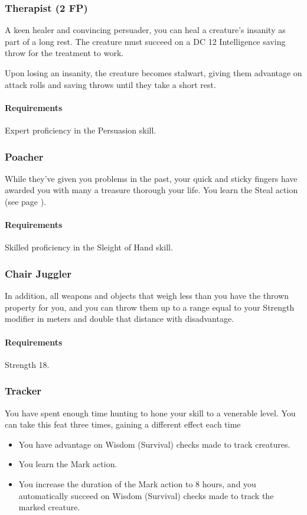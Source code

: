 \subsubsection{Therapist (2 FP)} \label{feat::therapist}
    A keen healer and convincing persuader, you can heal a creature's insanity as part of a long rest.
    The creature must succeed on a DC 12 Intelligence saving throw for the treatment to work.

    Upon losing an insanity, the creature becomes stalwart, giving them advantage on attack rolls and saving throws until they take a short rest.
    \paragraph{Requirements} Expert proficiency in the Persuasion skill.
\subsubsection{Poacher} \label{feat::poacher}
    While they've given you problems in the past, your quick and sticky fingers have awarded you with many a treasure thorough your life.
    You learn the Steal action (see page \pageref{act::steal}).
    \paragraph{Requirements} Skilled proficiency in the Sleight of Hand skill.
\subsubsection{Chair Juggler} \label{feat::chairjuggler}
    In addition, all weapons and objects that weigh less than you have the thrown property for you, and you can throw them up to a range equal to your Strength modifier in meters and double that distance with disadvantage.
    \paragraph{Requirements} Strength 18.
\subsubsection{Tracker} \label{feat::tracker}
    You have spent enough time hunting to hone your skill to a venerable level.
    You can take this feat three times, gaining a different effect each time
    \begin{itemize}
        \item You have advantage on Wisdom (Survival) checks made to track creatures.
        \item You learn the Mark action.
        \item You increase the duration of the Mark action to 8 hours, and you automatically succeed on Wisdom (Survival) checks made to track the marked creature.
    \end{itemize}
